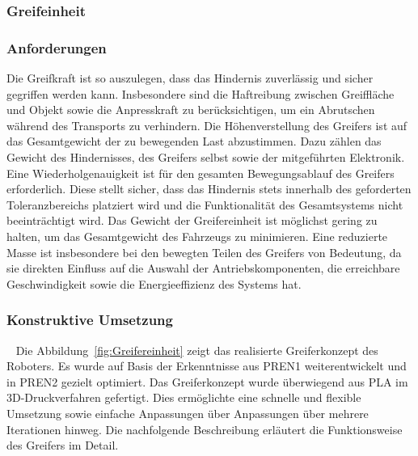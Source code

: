 \documentclass[main.tex]{subfiles} %
\begin{document}

\subsubsection{Greifeinheit}

\subsubsection*{Anforderungen}

Die Greifkraft ist so auszulegen, dass das Hindernis zuverlässig und sicher gegriffen werden kann.
Insbesondere sind die Haftreibung zwischen Greiffläche und Objekt sowie die Anpresskraft zu berücksichtigen,
um ein Abrutschen während des Transports zu verhindern. Die Höhenverstellung des Greifers ist auf das Gesamtgewicht
der zu bewegenden Last abzustimmen. Dazu zählen das Gewicht des Hindernisses, des Greifers selbst sowie der
mitgeführten Elektronik. Eine Wiederholgenauigkeit ist für den gesamten Bewegungsablauf des Greifers erforderlich.
Diese stellt sicher, dass das Hindernis stets innerhalb des geforderten Toleranzbereichs platziert wird und die
Funktionalität des Gesamtsystems nicht beeinträchtigt wird. Das Gewicht der Greifereinheit ist möglichst gering 
zu halten, um das Gesamtgewicht des Fahrzeugs zu minimieren. Eine reduzierte Masse ist insbesondere bei den bewegten
Teilen des Greifers von Bedeutung, da sie direkten Einfluss auf die Auswahl der Antriebskomponenten, die erreichbare
Geschwindigkeit sowie die Energieeffizienz des Systems hat.


\subsubsection*{Konstruktive Umsetzung}~\label{sec:Konstruktive_Umsetzung} 
Die Abbildung~\ref{fig:Greifereinheit} zeigt das realisierte Greiferkonzept des Roboters.
Es wurde auf Basis der Erkenntnisse aus PREN1 weiterentwickelt und in PREN2 gezielt optimiert.
Das Greiferkonzept wurde überwiegend aus PLA im 3D-Druckverfahren gefertigt.
Dies ermöglichte eine schnelle und flexible Umsetzung sowie einfache Anpassungen über Anpassungen
über mehrere Iterationen hinweg. Die nachfolgende Beschreibung erläutert die Funktionsweise des Greifers im Detail.
\end{document}
